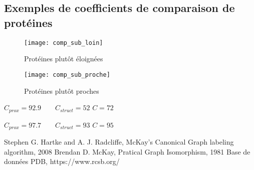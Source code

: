 \documentclass[a4paper, french, twoside]{article}
\begin{document}
\subsection{Exemples de coefficients de comparaison de protéines}
\begin{multicols}{2}
    \begin{figure}[H]
        \centering
        \texttt{[image: comp\_sub\_loin]}
        \caption{\label{fig: subcomp_loin} Protéines plutôt éloignées}
    \end{figure}
    \begin{figure}[H]
        \centering
        \texttt{[image: comp\_sub\_proche]}
        \caption{\label{fig: subcom_proche} Protéines plutôt proches}
    \end{figure}
\end{multicols}

\begin{multicols}{2}
    \begin{center}
        $C_{prox}=92.9 \qquad C_{struct}=52$\newline \newline
        $\boxed{C=72}$
    \end{center}
    \begin{center}
        $C_{prox}=97.7 \qquad C_{struct}=93$\newline \newline
        $\boxed{C=95}$
    \end{center}
\end{multicols}

\begin{thebibliography}{2} 
     Stephen G. Hartke and A. J. Radcliffe, McKay's Canonical Graph labeling algorithm, 2008 
     Brendan D. McKay, Pratical Graph Isomorphism, 1981
     Base de données PDB, https://www.rcsb.org/
\end{thebibliography}
\end{document}

